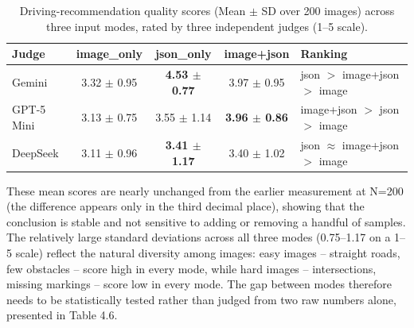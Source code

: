 \documentclass[12pt,a4paper]{report}
\begin{document}
\begin{table}[htbp]
    \centering
    \small
    \caption{Driving-recommendation quality scores (Mean $\pm$ SD over 200 images) across three input modes, rated by three independent judges (1--5 scale).}
    \label{tab:4.5}
    \begin{tabular}{@{}lccc p{3.4cm}@{}}
        \toprule
        \textbf{Judge} & \textbf{image\_only} & \textbf{json\_only} & \textbf{image+json} & \textbf{Ranking} \\
        \midrule
        Gemini      & 3.32 $\pm$ 0.95 & \textbf{4.53 $\pm$ 0.77} & 3.97 $\pm$ 0.95 & json $>$ image+json $>$ image \\
        GPT-5 Mini  & 3.13 $\pm$ 0.75 & 3.55 $\pm$ 1.14 & \textbf{3.96 $\pm$ 0.86} & image+json $>$ json $>$ image \\
        DeepSeek    & 3.11 $\pm$ 0.96 & \textbf{3.41 $\pm$ 1.17} & 3.40 $\pm$ 1.02 & json $\approx$ image+json $>$ image \\
        \bottomrule
    \end{tabular}
\end{table}

These mean scores are nearly unchanged from the earlier measurement at N=200 (the difference appears only in the third decimal place), showing that the conclusion is stable and not sensitive to adding or removing a handful of samples. The relatively large standard deviations across all three modes (0.75--1.17 on a 1--5 scale) reflect the natural diversity among images: easy images -- straight roads, few obstacles -- score high in every mode, while hard images -- intersections, missing markings -- score low in every mode. The gap between modes therefore needs to be statistically tested rather than judged from two raw numbers alone, presented in Table 4.6.
\end{document}
